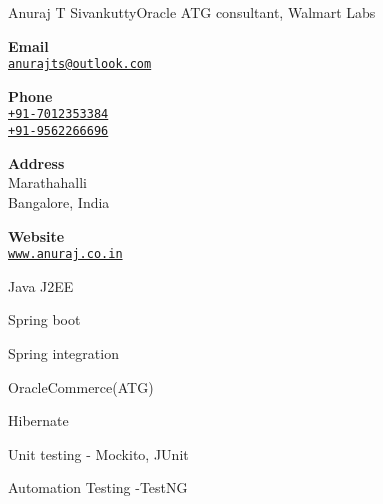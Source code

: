 \documentclass{article}
\begin{document}
\begin{cv}{Anuraj T Sivankutty}{Oracle ATG consultant, Walmart Labs}
\begin{cvitem}[Envelope][4]
    \textbf{Email}\\
    \href{mailto:anurajts@outlook.com}{\texttt{anurajts@outlook.com}}
\end{cvitem}

\cvseparator[3]
\begin{cvitem}[Phone][4]
    \textbf{Phone}\\
    \href{tel:+917012353384}{\texttt{+91-7012353384}}\\
    \href{tel:+91-9562266696}{\texttt{+91-9562266696}} 
\end{cvitem}

\cvseparator[3]
\begin{cvitem}[Home][4]
    \textbf{Address}\\
    Marathahalli\\ Bangalore, India
\end{cvitem}

\cvseparator[3]
\begin{cvitem}[Globe][4]
    \textbf{Website}\\
    \href{https://anuraj.co.in}{\texttt{www.anuraj.co.in}}
\end{cvitem}



\begin{cvitem}
    Java J2EE
\end{cvitem}

\cvseparator
\begin{cvitem}
    Spring boot
\end{cvitem}
\cvseparator

\begin{cvitem}
Spring integration
\end{cvitem}

\cvseparator
\begin{cvitem}OracleCommerce(ATG) \end{cvitem}

\cvseparator
\begin{cvitem}Hibernate
\end{cvitem}


\cvseparator
\begin{cvitem}
    Unit testing - Mockito, JUnit
\end{cvitem}

\begin{cvitem}
    Automation Testing -TestNG 
\end{cvitem}


\end{cv}
\end{document}
